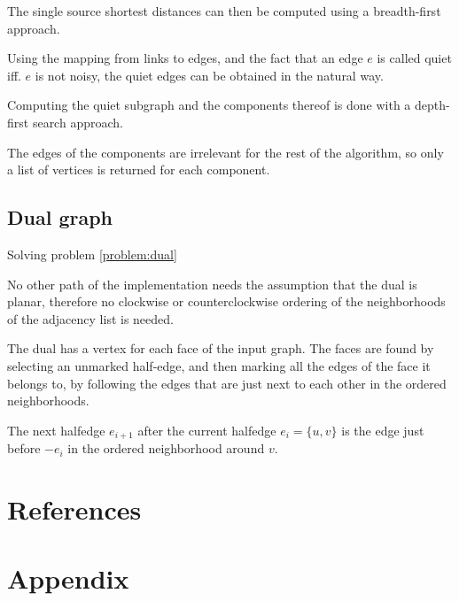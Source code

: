 \documentclass{article}
\begin{document}
		The single source shortest distances can then be computed using a breadth-first approach.

		Using the mapping from links to edges, and the fact that an edge $e$ is called quiet iff. $e$ is not noisy, the quiet edges can be obtained in the natural way.

		Computing the quiet subgraph and the components thereof is done with a depth-first search approach.

		The edges of the components are irrelevant for the rest of the algorithm, so only a list of vertices is returned for each component.


	\subsection{Dual graph}\label{impl:dual}

		Solving problem \ref{problem:dual}

		No other path of the implementation needs the assumption that the dual is planar, therefore no clockwise or counterclockwise ordering of the neighborhoods of the adjacency list is needed.

		The dual has a vertex for each face of the input graph. The faces are found by selecting an unmarked half-edge, and then marking all the edges of the face it belongs to, by following the edges that are just next to each other in the ordered neighborhoods.

		The next halfedge $e_{i+1}$ after the current halfedge $e_i = \{u, v\}$ is the edge just before $-e_i$ in the ordered neighborhood around $v$.



\newpage
\section{References}
	\printbibliography

\newpage
\section{Appendix}
\end{document}
